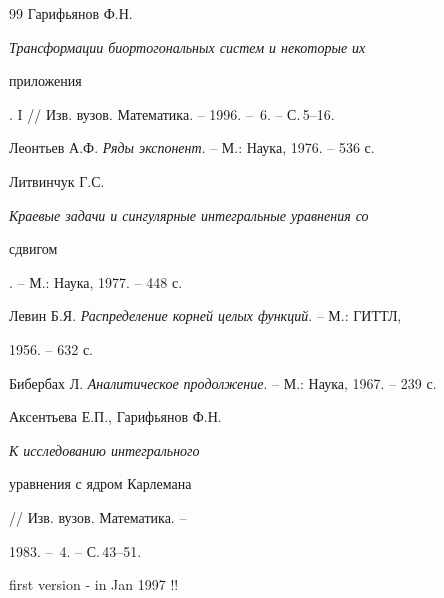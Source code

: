 \begin{thebibliography}{99}
Гарифьянов Ф.Н. {\em Трансформации биортогональных систем и некоторые их 


приложения}. I // Изв. вузов. Математика. -- 1996. -- \No\,6. -- С.\,5--16. 




Леонтьев А.Ф. {\em Ряды экспонент}. -- М.: Наука, 1976. -- 536 с. 




Литвинчук Г.С. {\em Краевые задачи и сингулярные интегральные уравнения со 


сдвигом}. -- М.: Наука, 1977. -- 448 с. 




Левин Б.Я. {\em Распределение корней целых функций}. -- М.: ГИТТЛ, 


1956. -- 632 с. 




Бибербах Л. {\em Аналитическое продолжение}. -- М.: Наука, 1967. -- 239 с. 




Аксентьева Е.П., Гарифьянов Ф.Н. {\em К исследованию интегрального 


уравнения с ядром Карлемана} // Изв. вузов. Математика. -- 


1983. -- \No\,4. -- С.\,43--51. 


 


\end{thebibliography} 


 


\vskip 2cm 


 






 


\label{end} 


 


 


 


 


 


first version - in Jan 1997 !! 


 


